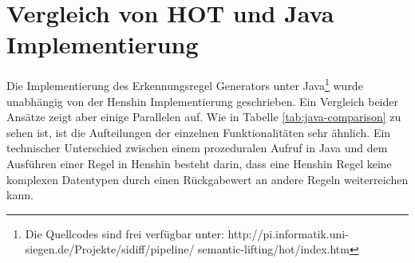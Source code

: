 \section{Vergleich von HOT und Java Implementierung}

% 

Die Implementierung des Erkennungsregel Generators unter Java\footnote{Die Quellcodes sind frei
verfügbar unter: http://pi.informatik.uni-siegen.de/Projekte/sidiff/pipeline/
semantic-lifting/hot/index.htm} wurde unabhängig von der Henshin Implementierung geschrieben. Ein
Vergleich beider Ansätze zeigt aber einige Parallelen auf. Wie in Tabelle \ref{tab:java-comparison}
zu sehen ist, ist die Aufteilungen der einzelnen Funktionalitäten sehr ähnlich. Ein technischer
Unterschied zwischen einem prozeduralen Aufruf in Java und dem Ausführen einer Regel in Henshin
besteht darin, dass eine Henshin Regel keine komplexen Datentypen durch einen Rückgabewert an
andere Regeln weiterreichen kann.

